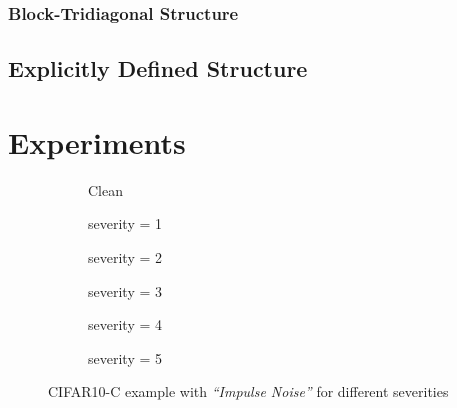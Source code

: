 \documentclass[a4paper, 11pt, oneside]{scrartcl}
\theoremstyle{break}
\numberwithin{equation}{section}
\begin{document}
			\subsubsection{Block-Tridiagonal Structure}
		\subsection{Explicitly Defined Structure}

	\section{Experiments}
			\begin{figure}
				\centering
				\hfill
				\begin{subfigure}{.16\textwidth}
					\centering
					Clean
				\end{subfigure}%
				\hfill
				\begin{subfigure}{.16\textwidth}
					\centering
					severity = 1
				\end{subfigure}%
				\hfill
				\begin{subfigure}{.16\textwidth}
					\centering
					severity = 2
				\end{subfigure}%
				\hfill
				\begin{subfigure}{.16\textwidth}
					\centering
					severity = 3
				\end{subfigure}%
				\hfill
				\begin{subfigure}{.16\textwidth}
					\centering
					severity = 4
				\end{subfigure}%
				\hfill
				\begin{subfigure}{.16\textwidth}
					\centering
					severity = 5
				\end{subfigure}%
				\caption{CIFAR10-C example with \emph{``Impulse Noise''} for different severities \parencite{HD19}}
			\end{figure}
\end{document}
